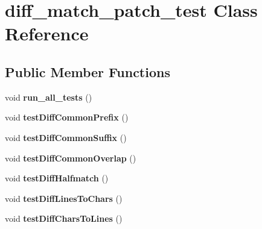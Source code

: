 \hypertarget{classdiff__match__patch__test}{}\section{diff\+\_\+match\+\_\+patch\+\_\+test Class Reference}
\label{classdiff__match__patch__test}
\subsection*{Public Member Functions}
\begin{DoxyCompactItemize}
\item 
\mbox{\label{classdiff__match__patch__test_a107b1500c80f8afe7e0c3f6290b9d0d1}} 
void {\bfseries run\+\_\+all\+\_\+tests} ()
\item 
\mbox{\label{classdiff__match__patch__test_a6c0e70321b1427a68cedba09269a9f9a}} 
void {\bfseries test\+Diff\+Common\+Prefix} ()
\item 
\mbox{\label{classdiff__match__patch__test_a2b1b22b6fad2570ebf2267c735744b8c}} 
void {\bfseries test\+Diff\+Common\+Suffix} ()
\item 
\mbox{\label{classdiff__match__patch__test_abc397f31b7541d63604cd27e42e2feaf}} 
void {\bfseries test\+Diff\+Common\+Overlap} ()
\item 
\mbox{\label{classdiff__match__patch__test_a0f67e6e5c3304f1ad4b0309e1b9c2f79}} 
void {\bfseries test\+Diff\+Halfmatch} ()
\item 
\mbox{\label{classdiff__match__patch__test_af96410f0cfbe3787ecd2be46125a8cdb}} 
void {\bfseries test\+Diff\+Lines\+To\+Chars} ()
\item 
\mbox{\label{classdiff__match__patch__test_a1500d0a57227ea8c0e220a00504bf71c}} 
void {\bfseries test\+Diff\+Chars\+To\+Lines} ()
\item 
\mbox{\label{classdiff__match__patch__test_a0c34bdc8b791f6a7afffdae1cedf4c45}} 

\end{DoxyCompactItemize}
